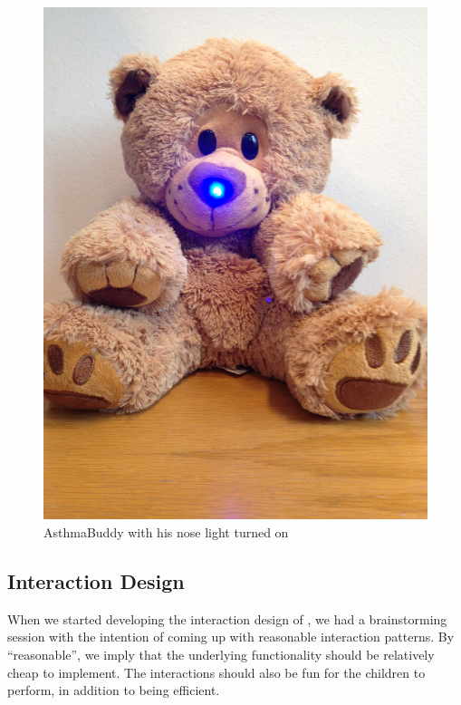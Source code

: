 \begin{figure}[H]
\begin{minipage}[t]{0.4\linewidth}
			\includegraphics[width=0.3\paperwidth]{Pictures/abbluelight.jpg}
		\caption{AsthmaBuddy with his nose light turned on}
		\label{fig:asthmabuddyandlightnose}
	\end{minipage}
\end{figure}


\subsection{Interaction Design}
\label{sec:interactiondesign}
When we started developing the interaction design of \buddy{}, we had a brainstorming session with the intention of coming up with reasonable interaction patterns.        
By ``reasonable'', we imply that the underlying functionality should be relatively cheap to implement. The interactions should also be fun for the children to perform, in addition to being efficient. 


